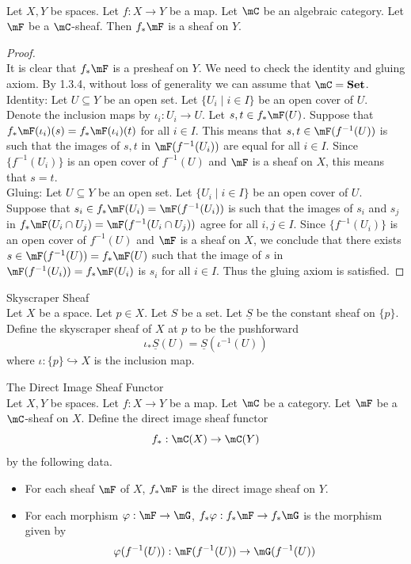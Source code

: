 \documentclass[a4paper]{article}
\begin{document}
\begin{prp}{}{}\\
Let $X,Y$ be spaces. Let $f:X\to Y$ be a map. Let $\mC$ be an algebraic category. Let $\mF$ be a $\mC$-sheaf. Then $f_\ast\mF$ is a sheaf on $Y$. 
\begin{proof}\\
It is clear that $f_\ast\mF$ is a presheaf on $Y$. We need to check the identity and gluing axiom. By 1.3.4, without loss of generality we can assume that $\mC=\bold{Set}$. \\

Identity: Let $U\subseteq Y$ be an open set. Let $\{U_i\;|\;i\in I\}$ be an open cover of $U$. Denote the inclusion maps by $\iota_i:U_i\to U$. Let $s,t\in f_\ast\mF(U)$. Suppose that $f_\ast\mF(\iota_i)(s)=f_\ast\mF(\iota_i)(t)$ for all $i\in I$. This means that $s,t\in\mF(f^{-1}(U))$ is such that the images of $s,t$ in $\mF(f^{-1}(U_i))$ are equal for all $i\in I$. Since $\{f^{-1}(U_i)\}$ is an open cover of $f^{-1}(U)$ and $\mF$ is a sheaf on $X$, this means that $s=t$. \\

Gluing: Let $U\subseteq Y$ be an open set. Let $\{U_i\;|\;i\in I\}$ be an open cover of $U$. Suppose that $s_i\in f_\ast\mF(U_i)=\mF(f^{-1}(U_i))$ is such that the images of $s_i$ and $s_j$ in $f_\ast\mF(U_i\cap U_j)=\mF(f^{-1}(U_i\cap U_j))$ agree for all $i,j\in I$. Since $\{f^{-1}(U_i)\}$ is an open cover of $f^{-1}(U)$ and $\mF$ is a sheaf on $X$, we conclude that there exists $s\in\mF(f^{-1}(U))=f_\ast\mF(U)$ such that the image of $s$ in $\mF(f^{-1}(U_i))=f_\ast\mF(U_i)$ is $s_i$ for all $i\in I$. Thus the gluing axiom is satisfied. 
\end{proof}
\end{prp}

\begin{eg}{Skyscraper Sheaf}{}\\
Let $X$ be a space. Let $p\in X$. Let $S$ be a set. Let $\underline{S}$ be the constant sheaf on $\{p\}$. Define the skyscraper sheaf of $X$ at $p$ to be the pushforward $$\iota_\ast\underline{S}(U)=\underline{S}(\iota^{-1}(U))$$ where $\iota:\{p\}\hookrightarrow X$ is the inclusion map. 
\end{eg}

\begin{defn}{The Direct Image Sheaf Functor}{}\\
Let $X,Y$ be spaces. Let $f:X\to Y$ be a map. Let $\mC$ be a category. Let $\mF$ be a $\mC$-sheaf on $X$. Define the direct image sheaf functor $$f_\ast:\mC(X)\to\mC(Y)$$ by the following data. 
\begin{itemize}
\item For each sheaf $\mF$ of $X$, $f_\ast\mF$ is the direct image sheaf on $Y$. 
\item For each morphism $\varphi:\mF\to\mG$, $f_\ast\varphi:f_\ast\mF\to f_\ast\mG$ is the morphism given by $$\varphi(f^{-1}(U)):\mF(f^{-1}(U))\to\mG(f^{-1}(U))$$
\end{itemize}
\end{defn}
\end{document}
